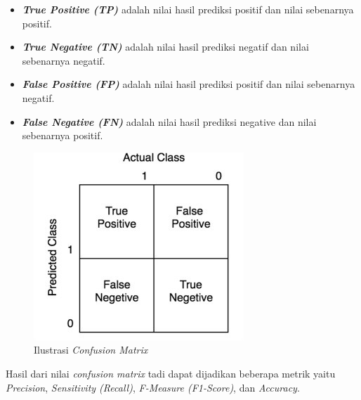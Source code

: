 \begin{itemize}
      \item \emph{\bfseries True Positive (TP)} adalah nilai hasil prediksi positif dan nilai sebenarnya positif.
      \item \emph{\bfseries True Negative (TN)} adalah nilai hasil prediksi negatif dan nilai sebenarnya negatif.
      \item \emph{\bfseries False Positive (FP)} adalah nilai hasil prediksi positif dan nilai sebenarnya negatif.
      \item \emph{\bfseries False Negative (FN)} adalah nilai hasil prediksi negative dan nilai sebenarnya positif.
\end{itemize}

\begin{figure}[H]
      \centering
      \includegraphics[scale=1]{assets/confusion_matrix.jpg}
      \caption{Ilustrasi \emph{Confusion Matrix}~\citep{Sharma2022}}
      \label{fig:ilustrasi_confusion_matrix}
\end{figure}


Hasil dari nilai \emph{confusion matrix} tadi dapat dijadikan beberapa metrik yaitu \emph{Precision},
\emph{Sensitivity (Recall)}, \emph{F-Measure (F1-Score)}, dan \emph{Accuracy}.


